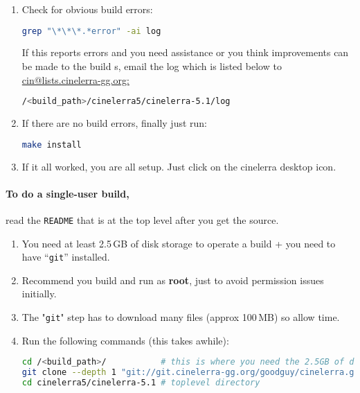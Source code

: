 \begin{enumerate}
        \begin{lstlisting}[language=bash]
./blds/bld_prepare.sh <os> # where <os> represents the Operating System of centos, fedora, suse, leap, ubuntu, debian.
./autogen.sh
./configure --prefix=/usr  # optional parameters can be added here
make 2>&1 | tee log        # make and log the build
        \end{lstlisting}
    \item  Check for obvious build errors:
        \begin{lstlisting}[language=bash]
grep "\*\*\*.*error" -ai log
        \end{lstlisting}
        If this reports errors and you need assistance or you think improvements can be made to the build s,
        email the log which is listed below to \url{cin@lists.cinelerra-gg.org:}
        \begin{lstlisting}[language=bash]
/<build_path>/cinelerra5/cinelerra-5.1/log
        \end{lstlisting}
    \item  If there are no build errors, finally just run:
        \begin{lstlisting}[language=bash]
    make install
        \end{lstlisting}
    \item  If it all worked, you are all setup. Just click on the cinelerra desktop icon.
\end{enumerate}

\paragraph{To do a single-user build,} read the \texttt{README} that is at the top level after you get the source.
\begin{enumerate}
    \item  You need at least 2.5\,GB of disk storage to operate a build + you need to have  “\texttt{git}” installed.
    \item  Recommend you build and run as \textbf{root}, just to avoid permission issues initially.
    \item  The "\texttt{git}" step has to download many files (approx 100\,MB) so allow time.
    \item  Run the following commands (this takes awhile):
        \begin{lstlisting}[language=bash]
cd /<build_path>/           # this is where you need the 2.5GB of disk space
git clone --depth 1 "git://git.cinelerra-gg.org/goodguy/cinelerra.git" cinelerra5 
cd cinelerra5/cinelerra-5.1 # toplevel directory
        \end{lstlisting}
\end{enumerate}

